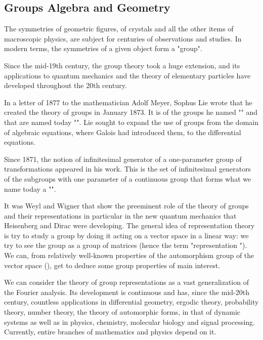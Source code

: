 	\subsection{Groups Algebra and Geometry}
	The symmetries of geometric figures, of crystals and all the other items of macroscopic physics, are subject for centuries of observations and studies. In modern terms, the symmetries of a given object form a "group".
	
	Since the mid-19th century, the group theory took a huge extension, and its applications to quantum mechanics and the theory of elementary particles have developed throughout the 20th century.
	
	In a letter of 1877 to the mathematician Adolf Meyer, Sophus Lie wrote that he created the theory of groups in January 1873. It is of the groups he named "" and that are named today "\label{lie group}". Lie sought to expand the use of groups from the domain of algebraic equations, where Galois had introduced them, to the differential equations.
	
	Since 1871, the notion of infinitesimal generator of a one-parameter group of transformations appeared in his work. This is the set of infinitesimal generators of the subgroups with one parameter of a continuous group that forms what we name today a "".
	
	It was Weyl and Wigner that show the preeminent role of the theory of groups and their representations in particular in the new quantum mechanics that Heisenberg  and Dirac were developing. The general idea of representation theory is try to study a group by doing it acting on a vector space in a linear way: we try to see the group as a group of matrices (hence the term "representation "). We can, from relatively well-known properties of the automorphism group of the vector space (), get to deduce some group properties of main interest.
	
	We can consider the theory of group representations as a vast generalization of the Fourier analysis. Its development is continuous and has, since the mid-20th century, countless applications in differential geometry, ergodic theory, probability theory, number theory, the theory of automorphic forms, in that of dynamic systems as well as in physics, chemistry, molecular biology and signal processing. Currently, entire branches of mathematics and physics depend on it.
	
